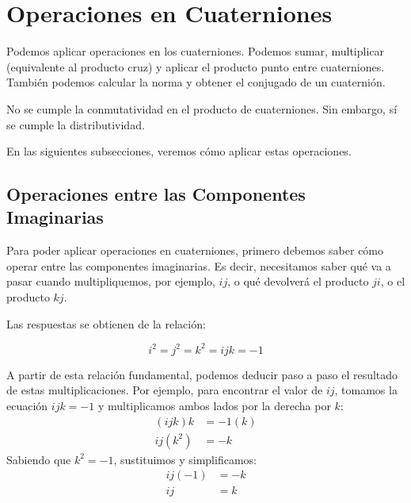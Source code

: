 \section{Operaciones en Cuaterniones}
Podemos aplicar operaciones en los cuaterniones. Podemos sumar, multiplicar (equivalente al producto cruz) y aplicar el producto punto entre cuaterniones. También podemos calcular la norma y obtener el conjugado de un cuaternión. 

No se cumple la conmutatividad en el producto de cuaterniones. Sin embargo, sí se cumple la distributividad. 

En las siguientes subsecciones, veremos cómo aplicar estas operaciones.

\subsection{Operaciones entre las Componentes Imaginarias}
Para poder aplicar operaciones en cuaterniones, primero debemos saber cómo operar entre las componentes imaginarias. Es decir, necesitamos saber qué va a pasar cuando multipliquemos, por ejemplo, $ij$, o qué devolverá el producto $ji$, o el producto $kj$. 

Las respuestas se obtienen de la relación:

\begin{equation}
    i^{2}=j^{2}=k^{2}=ijk=-1
\end{equation}



A partir de esta relación fundamental, podemos deducir paso a paso el resultado de estas multiplicaciones. Por ejemplo, para encontrar el valor de $ij$, tomamos la ecuación $ijk = -1$ y multiplicamos ambos lados por la derecha por $k$:
\begin{align*}
    (ijk)k &= -1(k) \\
    ij(k^2) &= -k 
\end{align*}
Sabiendo que $k^2 = -1$, sustituimos y simplificamos:
\begin{align*}
    ij(-1) &= -k \\
    ij &= k
\end{align*}

